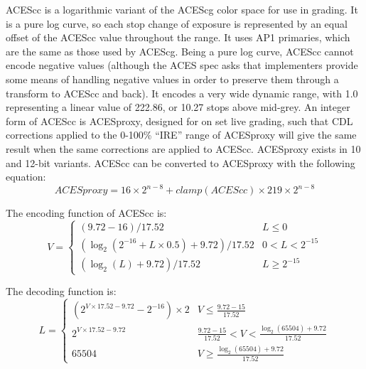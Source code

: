 ACEScc is a logarithmic variant of the ACEScg color space for use in grading.
It is a pure log curve, so each stop change of exposure is represented by an equal offset of the ACEScc value throughout the range.
It uses AP1 primaries, which are the same as those used by ACEScg.
Being a pure log curve, ACEScc cannot encode negative values (although the ACES spec asks that implementers provide some means of handling negative values in order to preserve them through a transform to ACEScc and back).
It encodes a very wide dynamic range, with 1.0 representing a linear value of 222.86, or 10.27 stops above mid-grey.
\ccPar{}
An integer form of ACEScc is ACESproxy, designed for on set live grading, such that CDL corrections applied to the 0-100\% ``IRE'' range of ACESproxy will give the same result when the same corrections are applied to ACEScc.
ACESproxy exists in 10 and 12-bit variants.
ACEScc can be converted to ACESproxy with the following equation:
\begin{equation}
    ACESproxy = 16 \times 2^{n-8} + clamp(ACEScc) \times 219 \times 2^{n-8}
\end{equation}

The encoding function of ACEScc is:
\begin{equation}
    V =
    \begin{cases}
        (9.72 - 16) / 17.52 & L \leq 0 \\
        (\log _2(2^{-16} + L \times 0.5) + 9.72) / 17.52 & 0 < L < 2^{-15} \\
        (\log _2(L) + 9.72) / 17.52 & L \geq 2^{-15}
    \end{cases}
\end{equation}

\begin{figure}[H]
    \label{fig:acescc}
\end{figure}

The decoding function is:
\begin{equation}
    L =
    \begin{cases}
        (2^{V \times 17.52 - 9.72} - 2^{-16}) \times 2 & V \leq \frac{9.72 - 15}{17.52} \\
        2^{V \times 17.52 - 9.72} & \frac{9.72 - 15}{17.52} < V < \frac{\log _2(65504) + 9.72}{17.52} \\
        65504 & V \geq \frac{\log _2(65504) + 9.72}{17.52}
    \end{cases}
\end{equation}

